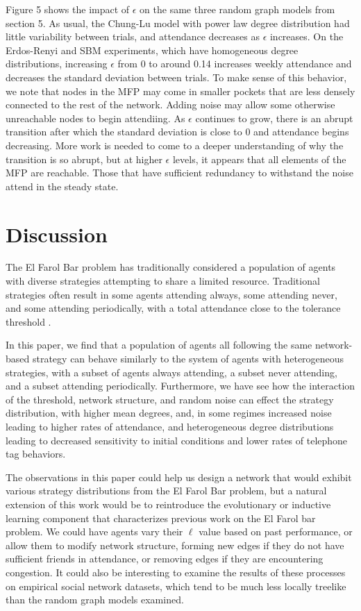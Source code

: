 \documentclass[12pt]{article}
\begin{document}
Figure 5 shows the impact of $\epsilon$ on the same three random graph models from section 5.  As usual, the Chung-Lu model with power law degree distribution had little variability between trials, and attendance decreases as $\epsilon$ increases.  On the Erdos-Renyi and SBM experiments, which have homogeneous degree distributions, increasing $\epsilon$ from 0 to around 0.14 increases weekly attendance and decreases the standard deviation between trials.  To make sense of this behavior, we note that nodes in the MFP may come in smaller pockets that are less densely connected to the rest of the network.  Adding noise may allow some otherwise unreachable nodes to begin attendiing.  As $\epsilon$ continues to grow, there is an abrupt transition after which the standard deviation is close to 0 and attendance begins decreasing.  More work is needed to come to a deeper understanding of why the transition is so abrupt, but at higher $\epsilon$ levels, it appears that all elements of the MFP are reachable.  Those that have sufficient redundancy to withstand the noise attend in the steady state.  

\section{Discussion}

The El Farol Bar problem has traditionally considered a population of agents with diverse strategies attempting to share a limited resource.  Traditional strategies often result in some agents attending always, some attending never, and some attending periodically, with a total attendance close to the tolerance threshold\cite{arthur:1994} \cite{stLuce:2020}.

In this paper, we find that a population of agents all following the same network-based strategy can behave similarly to the system of agents with heterogeneous strategies, with a subset of agents always attending, a subset never attending, and a subset attending periodically.  Furthermore, we have see how the interaction of the threshold, network structure, and random noise can effect the strategy distribution, with higher mean degrees, and, in some regimes increased noise leading to higher rates of attendance, and heterogeneous degree distributions leading to decreased sensitivity to initial conditions and lower rates of telephone tag behaviors.

The observations in this paper could help us design a network that would exhibit various strategy distributions from the El Farol Bar problem, but a natural extension of this work would be to reintroduce the evolutionary or inductive learning component that characterizes previous work on the El Farol bar problem.  We could have agents vary their $\ell$ value based on past performance, or allow them to modify network structure, forming new edges if they do not have sufficient friends in attendance, or removing edges if they are encountering congestion.  It could also be interesting to examine the results of these processes on empirical social network datasets, which tend to be much less locally treelike than the random graph models examined.    
\end{document}
